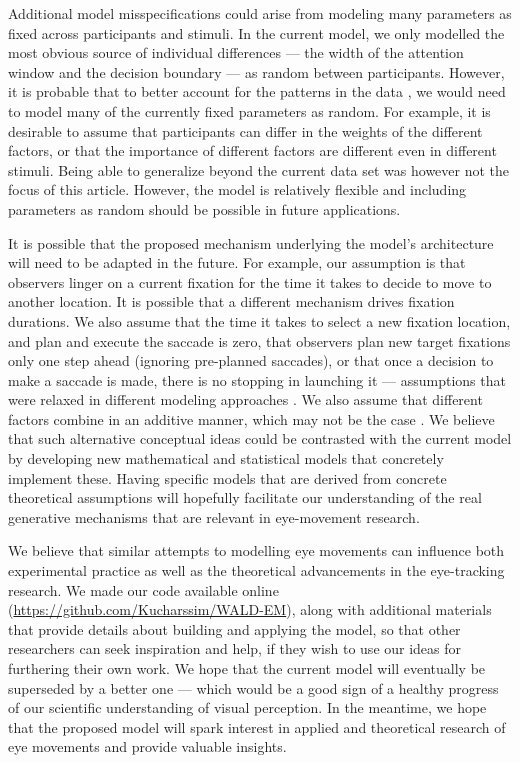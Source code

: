 \documentclass{article}
\begin{document}
Additional model misspecifications could arise from modeling many parameters as fixed across participants and stimuli. In the current model, we only modelled the most obvious source of individual differences --- the width of the attention window and the decision boundary --- as random between participants. However, it is probable that to better account for the patterns in the data \citep[and to justify generalizibility to a population of observers and a population of stimuli; ][]{yarkoni2019generalizability}, we would need to model many of the currently fixed parameters as random. For example, it is desirable to assume that participants can differ in the weights of the different factors, or that the importance of different factors are different even in different stimuli. Being able to generalize beyond the current data set was however not the focus of this article. However, the model is relatively flexible and including parameters as random should be possible in future applications.

It is possible that the proposed mechanism underlying the model's architecture will need to be adapted in the future. For example, our assumption is that observers linger on a current fixation for the time it takes to decide to move to another location. It is possible that a different mechanism drives fixation durations. We also assume that the time it takes to select a new fixation location, and plan and execute the saccade is zero, that observers plan new target fixations only one step ahead (ignoring pre-planned saccades), or that once a decision to make a saccade is made, there is no stopping in launching it --- assumptions that were relaxed in different modeling approaches \citep{nuthmann2010crisp,nuthmann2017fixation_durations,trukenbrod2014icat}. We also assume that different factors combine in an additive manner, which may not be the case \citep{barthelme2013spatial}. We believe that such alternative conceptual ideas could be contrasted with the current model by developing new mathematical and statistical models that concretely implement these. Having specific models that are derived from concrete theoretical assumptions will hopefully facilitate our understanding of the real generative mechanisms \citep{borsboom2020theory,schutt2017likelihood} that are relevant in eye-movement research. 

We believe that similar attempts to modelling eye movements can influence both experimental practice as well as the theoretical advancements in the eye-tracking research. We made our code available online (\url{https://github.com/Kucharssim/WALD-EM}), along with additional materials that provide details about building and applying the model, so that other researchers can seek inspiration and help, if they wish to use our ideas for furthering their own work. We hope that the current model will eventually be superseded by a better one --- which would be a good sign of a healthy progress of our scientific understanding of visual perception. In the meantime, we hope that the proposed model will spark interest in applied and theoretical research of eye movements and provide valuable insights.
\end{document}
